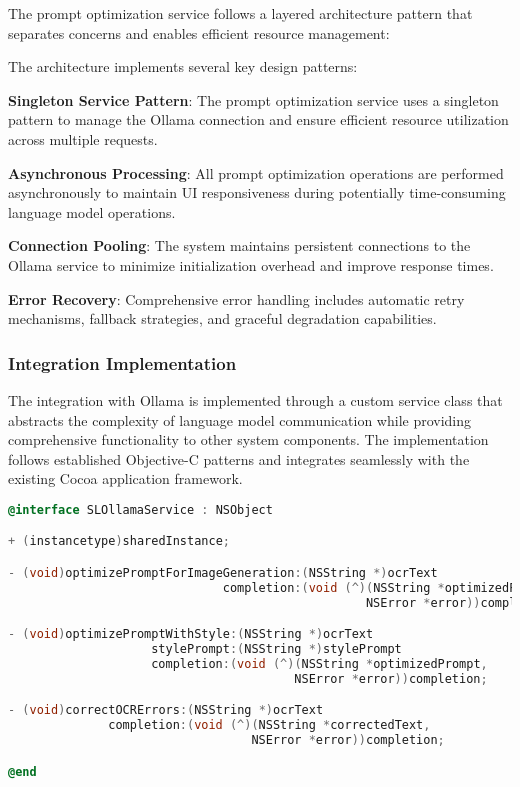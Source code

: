 The prompt optimization service follows a layered architecture pattern that separates concerns and enables efficient resource management:


The architecture implements several key design patterns:

\textbf{Singleton Service Pattern}: The prompt optimization service uses a singleton pattern to manage the Ollama connection and ensure efficient resource utilization across multiple requests.

\textbf{Asynchronous Processing}: All prompt optimization operations are performed asynchronously to maintain UI responsiveness during potentially time-consuming language model operations.

\textbf{Connection Pooling}: The system maintains persistent connections to the Ollama service to minimize initialization overhead and improve response times.

\textbf{Error Recovery}: Comprehensive error handling includes automatic retry mechanisms, fallback strategies, and graceful degradation capabilities.

\subsubsection{Integration Implementation}

The integration with Ollama is implemented through a custom service class that abstracts the complexity of language model communication while providing comprehensive functionality to other system components. The implementation follows established Objective-C patterns and integrates seamlessly with the existing Cocoa application framework.

\begin{lstlisting}[language=C,basicstyle=\footnotesize\ttfamily,frame=single,breaklines=true,columns=flexible,caption={Ollama Service Integration Interface},label={lst:ollama_interface}]
@interface SLOllamaService : NSObject

+ (instancetype)sharedInstance;

- (void)optimizePromptForImageGeneration:(NSString *)ocrText
                              completion:(void (^)(NSString *optimizedPrompt, 
                                                  NSError *error))completion;

- (void)optimizePromptWithStyle:(NSString *)ocrText
                    stylePrompt:(NSString *)stylePrompt
                    completion:(void (^)(NSString *optimizedPrompt, 
                                        NSError *error))completion;

- (void)correctOCRErrors:(NSString *)ocrText
              completion:(void (^)(NSString *correctedText, 
                                  NSError *error))completion;

@end
\end{lstlisting}

